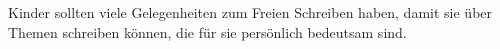 Kinder sollten viele Gelegenheiten zum Freien Schreiben haben, damit sie über Themen schreiben können, die für sie persönlich bedeutsam sind.